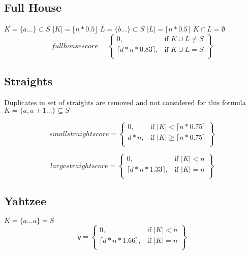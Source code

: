\documentclass{article}
\begin{document}
\subsection{Full House}
$K = \{a \dots\} \subset S$ $\lvert K \rvert = \lfloor n * 0.5 \rfloor$ \newline
$L = \{b \dots\} \subset S$ $\lvert L \rvert = \lceil n * 0.5 \rceil$ \newline
$K \cap L = \emptyset$
\begin{equation}
fullhousescore =
\left\{
    \begin{array}{lr}
    0, & \text{if } K \cup L \neq S\\
    \lceil d * n * 0.83 \rceil, & \text{if } K \cup L = S\\
    \end{array}
\right\}
\end{equation}

\subsection{Straights}
Duplicates in set of straights are removed and not considered for this formula \newline
$K = \{a, a + 1\dots \} \subseteq S$

\begin{equation}
smallstraightscore =
\left\{
    \begin{array}{lr}
    0, & \text{if } \lvert K \rvert < \lceil n * 0.75 \rceil\\
    d * n, & \text{if } \lvert K \rvert \geq \lceil n * 0.75 \rceil\\
    \end{array}
\right\}
\end{equation}

\begin{equation}
largestraightscore =
\left\{
    \begin{array}{lr}
    0, & \text{if } \lvert K \rvert < n\\
    \lceil d * n * 1.33 \rceil, &\text{if } \lvert K \rvert = n\\
    \end{array}
\right\}
\end{equation}

\subsection{Yahtzee}
$K = \{a \dots a\} = S$
\begin{equation}
y=
\left\{
    \begin{array}{lr}
    0, & \text{if } \lvert K \rvert < n\\
    \lceil d * n * 1.66 \rceil, &\text{if } \lvert K \rvert = n\\
    \end{array}
\right\}
\end{equation}
\end{document}
